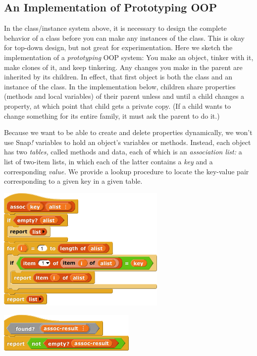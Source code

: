 \subsection{An Implementation of Prototyping
OOP}\label{an-implementation-of-prototyping-oop}

In the class/instance system above, it is necessary to design the
complete behavior of a class before you can make any instances of the
class. This is okay for top-down design, but not great for
experimentation. Here we sketch the implementation of a
\emph{prototyping} OOP system: You make an object, tinker with it, make
clones of it, and keep tinkering. Any changes you make in the parent are
inherited by its children. In effect, that first object is both the
class and an instance of the class. In the implementation below,
children share properties (methods and local variables) of their parent
unless and until a child changes a property, at which point that child
gets a private copy. (If a child wants to change something for its
entire family, it must ask the parent to do it.)

Because we want to be able to create and delete properties dynamically,
we won't use Snap\emph{!} variables to hold an object's variables or
methods. Instead, each object has two \emph{tables,} called methods and
data, each of which is an \emph{association list:} a list of two-item
lists, in which each of the latter contains a \emph{key} and a
corresponding \emph{value.} We provide a lookup procedure to locate the
key-value pair corresponding to a given key in a given table.

\includegraphics[width=3.21528in,height=2.36111in]{media/image858.png}

\includegraphics[width=2.625in,height=0.78125in]{media/image859.png}

